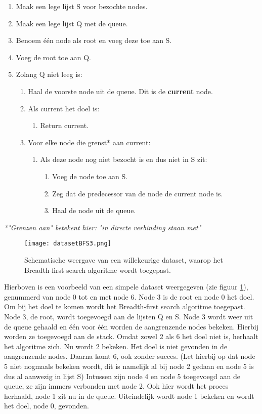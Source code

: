 \begin{enumerate}
\item Maak een lege lijst S voor bezochte nodes.
\item Maak een lege lijst Q met de queue.
\item Benoem \'e\'en node als root en voeg deze toe aan S.
\item Voeg de root toe aan Q. 
\item Zolang Q niet leeg is:
	\begin{enumerate}
	\item Haal de voorste node uit de queue. Dit is de \textbf{current} node.
	\item Als current het doel is:
		\begin{enumerate}
		\item Return current.
		\end{enumerate}
	\item Voor elke node die grenst* aan current:
		\begin{enumerate}
		\item Als deze node nog niet bezocht is en dus niet in S zit:
			\begin{enumerate}
			\item Voeg de node toe aan S.
			\item Zeg dat de predecessor van de node de current node is.
			\item Haal de node uit de queue.
			\end{enumerate}
		\end{enumerate}
	\end{enumerate}
\end{enumerate}

\textit{*"Grenzen aan" betekent hier: "in directe verbinding staan met"}

\begin{figure}[H]
  \centering
    \texttt{[image: datasetBFS3.png]}
  \caption{Schematische weergave van een willekeurige dataset, waarop het Breadth-first search algoritme wordt toegepast.}
  \label{fig:datasetBFS3}
\end{figure}

Hierboven is een voorbeeld van een simpele dataset weergegeven (zie figuur \ref{fig:datasetBFS3}), genummerd van node 0 tot en met node 6. Node 3 is de root en node 0 het doel. Om bij het doel te komen wordt het Breadth-first search algoritme toegepast. Node 3, de root, wordt toegevoegd aan de lijsten Q en S. Node 3 wordt weer uit de queue gehaald en \'e\'en voor \'e\'en worden de aangrenzende nodes bekeken. Hierbij worden ze toegevoegd aan de stack. Omdat zowel 2 als 6 het doel niet is, herhaalt het algoritme zich. Nu wordt 2 bekeken. Het doel is niet gevonden in de aangrenzende nodes. Daarna komt 6, ook zonder succes. (Let hierbij op dat node 5 niet nogmaals bekeken wordt, dit is namelijk al bij node 2 gedaan en node 5 is dus al aanwezig in lijst S) Intussen zijn node 4 en node 5 toegevoegd aan de queue, ze zijn immers verbonden met node 2. Ook hier wordt het proces herhaald, node 1 zit nu in de queue. Uiteindelijk wordt node 1 bekeken en wordt het doel, node 0, gevonden.

